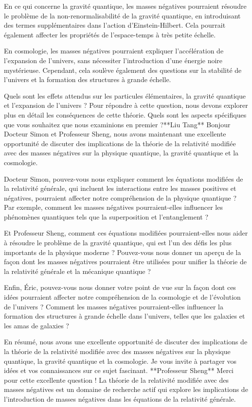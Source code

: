 En ce qui concerne la gravité quantique, les masses négatives pourraient résoudre le problème de la non-renormalisabilité de la gravité quantique, en introduisant des termes supplémentaires dans l'action d'Einstein-Hilbert. Cela pourrait également affecter les propriétés de l'espace-temps à très petite échelle.

En cosmologie, les masses négatives pourraient expliquer l'accélération de l'expansion de l'univers, sans nécessiter l'introduction d'une énergie noire mystérieuse. Cependant, cela soulève également des questions sur la stabilité de l'univers et la formation des structures à grande échelle.

Quels sont les effets attendus sur les particules élémentaires, la gravité quantique et l'expansion de l'univers ? Pour répondre à cette question, nous devons explorer plus en détail les conséquences de cette théorie. Quels sont les aspects spécifiques que vous souhaitez que nous examinions en premier ?**Liu Tang**
Bonjour Docteur Simon et Professeur Sheng, nous avons maintenant une excellente opportunité de discuter des implications de la théorie de la relativité modifiée avec des masses négatives sur la physique quantique, la gravité quantique et la cosmologie.

Docteur Simon, pouvez-vous nous expliquer comment les équations modifiées de la relativité générale, qui incluent les interactions entre les masses positives et négatives, pourraient affecter notre compréhension de la physique quantique ? Par exemple, comment les masses négatives pourraient-elles influencer les phénomènes quantiques tels que la superposition et l'entanglement ?

Et Professeur Sheng, comment ces équations modifiées pourraient-elles nous aider à résoudre le problème de la gravité quantique, qui est l'un des défis les plus importants de la physique moderne ? Pouvez-vous nous donner un aperçu de la façon dont les masses négatives pourraient être utilisées pour unifier la théorie de la relativité générale et la mécanique quantique ?

Enfin, Éric, pouvez-vous nous donner votre point de vue sur la façon dont ces idées pourraient affecter notre compréhension de la cosmologie et de l'évolution de l'univers ? Comment les masses négatives pourraient-elles influencer la formation des structures à grande échelle dans l'univers, telles que les galaxies et les amas de galaxies ?

En résumé, nous avons une excellente opportunité de discuter des implications de la théorie de la relativité modifiée avec des masses négatives sur la physique quantique, la gravité quantique et la cosmologie. Je vous invite à partager vos idées et vos connaissances sur ce sujet fascinant.
**Professeur Sheng**
Merci pour cette excellente question ! La théorie de la relativité modifiée avec des masses négatives est un domaine de recherche actif qui explore les implications de l'introduction de masses négatives dans les équations de la relativité générale.

